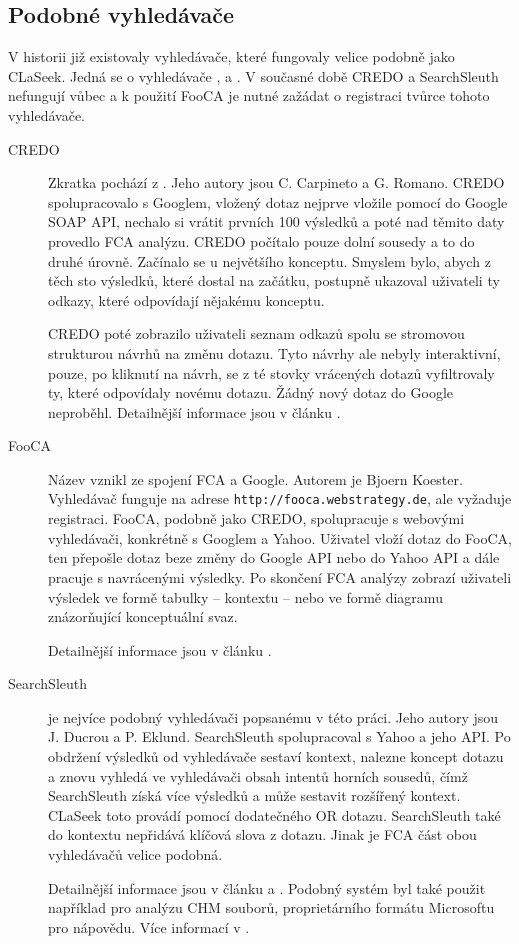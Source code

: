 \documentclass[12pt]{article}
\newcommand{\name}{CLaSeek}
\newcommand{\code}[1]{\texttt{#1}}
\newcommand{\ssection}[1]{\subsection{#1}}
\begin{document}
\ssection{Podobné vyhledávače}\label{ch.fcaengines}
V historii již existovaly vyhledávače, které fungovaly velice podobně jako \name. Jedná se o vyhledávače ,  a . V současné době CREDO a SearchSleuth nefungují vůbec a k použití FooCA je nutné zažádat o registraci tvůrce tohoto vyhledávače. 

\begin{description}
	\item[CREDO] Zkratka pochází z . Jeho autory jsou C. Carpineto a G. Romano. CREDO spolupracovalo s Googlem, vložený dotaz nejprve vložile pomocí do Google SOAP API, nechalo si vrátit prvních 100 výsledků a poté nad těmito daty provedlo FCA analýzu. CREDO počítalo pouze dolní sousedy a to do druhé úrovně. Začínalo se u největšího konceptu. Smyslem bylo, abych z těch sto výsledků, které dostal na začátku, postupně ukazoval uživateli ty odkazy, které odpovídají nějakému konceptu. 

	CREDO poté zobrazilo uživateli seznam odkazů spolu se stromovou strukturou návrhů na změnu dotazu. Tyto návrhy ale nebyly interaktivní, pouze, po kliknutí na návrh, se z té stovky vrácených dotazů vyfiltrovaly ty, které odpovídaly novému dotazu. Žádný nový dotaz do Google neproběhl. Detailnější informace jsou v článku \cite{credo}.

	\item[FooCA] Název vznikl ze spojení FCA a Google. Autorem je Bjoern Koester. Vyhledávač funguje na adrese \code{http://fooca.webstrategy.de}, ale vyžaduje registraci. FooCA, podobně jako CREDO, spolupracuje s webovými vyhledávači, konkrétně s Googlem a Yahoo. Uživatel vloží dotaz do Foo\-CA, ten přepošle dotaz beze změny do Google API nebo do Yahoo API a dále pracuje s navrácenými výsledky. Po skončení FCA analýzy zobrazí uživateli výsledek ve formě tabulky -- kontextu -- nebo ve formě diagramu znázorňující konceptuální svaz. 

	Detailnější informace jsou v článku \cite{fooca}.
	\item[SearchSleuth] je nejvíce podobný vyhledávači popsanému v této práci. Jeho autory jsou J. Ducrou a P. Eklund. SearchSleuth  spolupracoval s Yahoo a jeho API. Po obdržení výsledků od vyhledávače sestaví kontext, nalezne koncept dotazu a znovu vyhledá ve vyhledávači obsah intentů horních sousedů, čímž SearchSleuth získá více výsledků a může sestavit rozšířený kontext. \name{} toto provádí pomocí dodatečného OR dotazu. SearchSleuth také do kontextu nepřidává klíčová slova z dotazu. Jinak je FCA část obou vyhledávačů velice podobná. 

	Detailnější informace jsou v článku \cite{searchsleuth} a \cite{fcasim}. Podobný systém byl také použit například pro analýzu CHM souborů, proprietárního formátu Microsoftu pro nápovědu. Více informací v \cite{helpsleuth}.
\end{description} 
\end{document}
